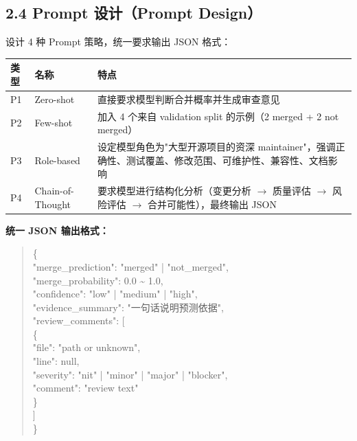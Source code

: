 \documentclass{experimentreport}
\begin{document}
{\subsection*{2.4 Prompt 设计（Prompt Design）}

设计 4 种 Prompt 策略，统一要求输出 JSON 格式：

\begin{center}
\begin{tabular}{|l|l|p{6cm}|}
\hline
\textbf{类型} & \textbf{名称} & \textbf{特点} \\
\hline
P1 & Zero-shot & 直接要求模型判断合并概率并生成审查意见 \\
\hline
P2 & Few-shot & 加入 4 个来自 validation split 的示例（2 merged + 2 not merged） \\
\hline
P3 & Role-based & 设定模型角色为"大型开源项目的资深 maintainer"，强调正确性、测试覆盖、修改范围、可维护性、兼容性、文档影响 \\
\hline
P4 & Chain-of-Thought & 要求模型进行结构化分析（变更分析 $\to$ 质量评估 $\to$ 风险评估 $\to$ 合并可能性），最终输出 JSON \\
\hline
\end{tabular}
\end{center}

\textbf{统一 JSON 输出格式：}

\begin{quote}
\ttfamily
\{ \\
\hspace*{2em}"merge\_prediction": "merged" | "not\_merged", \\
\hspace*{2em}"merge\_probability": 0.0 \textasciitilde{} 1.0, \\
\hspace*{2em}"confidence": "low" | "medium" | "high", \\
\hspace*{2em}"evidence\_summary": "一句话说明预测依据", \\
\hspace*{2em}"review\_comments": [ \\
\hspace*{4em}\{ \\
\hspace*{6em}"file": "path or unknown", \\
\hspace*{6em}"line": null, \\
\hspace*{6em}"severity": "nit" | "minor" | "major" | "blocker", \\
\hspace*{6em}"comment": "review text" \\
\hspace*{4em}\} \\
\hspace*{2em}] \\
\}
\end{quote}

}
\end{document}
